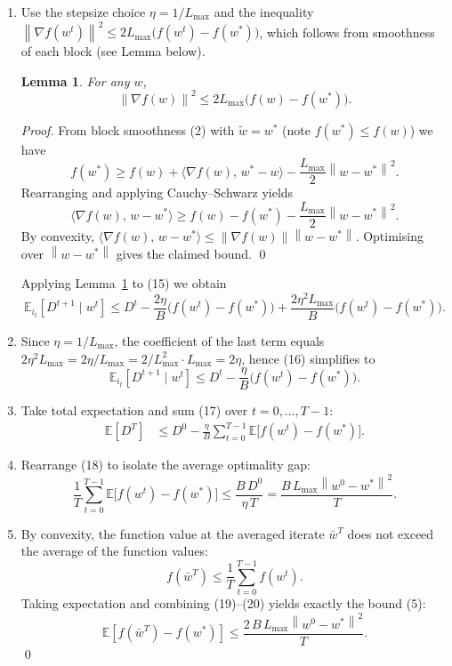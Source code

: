 \documentclass[11pt]{article}
\newtheorem{lemma}{Lemma}
\newcommand{\E}{\mathbb{E}}
\newcommand{\norm}[1]{\left\|#1\right\|}
\begin{document}
\begin{enumerate}
\item[Step 6.] Use the stepsize choice $\eta=1/L_{\max}$ and the inequality
$\norm{\nabla f(w^{t})}^{2}\le 2L_{\max}\bigl(f(w^{t})-f(w^{*})\bigr)$,
which follows from smoothness of each block (see Lemma below).  
\begin{lemma}\label{lem:smooth-grad}
For any $w$,
\[
\norm{\nabla f(w)}^{2}\le 2L_{\max}\bigl(f(w)-f(w^{*})\bigr).
\]
\end{lemma}
\begin{proof}
From block smoothness (2) with $\tilde w = w^{*}$ (note $f(w^{*})\le f(w)$) we have
\[
f(w^{*})\ge f(w)+\langle \nabla f(w),\,w^{*}-w\rangle
-\frac{L_{\max}}{2}\norm{w-w^{*}}^{2}.
\]
Rearranging and applying Cauchy–Schwarz yields
\[
\langle \nabla f(w),\,w-w^{*}\rangle \ge f(w)-f(w^{*})-\frac{L_{\max}}{2}\norm{w-w^{*}}^{2}.
\]
By convexity, $\langle \nabla f(w),\,w-w^{*}\rangle\le \norm{\nabla f(w)}\norm{w-w^{*}}$.
Optimising over $\norm{w-w^{*}}$ gives the claimed bound. \hfill\qed
\end{proof}
Applying Lemma~\ref{lem:smooth-grad} to (15) we obtain
\[
\E_{i_{t}}[D^{t+1}\mid w^{t}]
\le D^{t}
-\frac{2\eta}{B}\bigl(f(w^{t})-f(w^{*})\bigr)
+\frac{2\eta^{2}L_{\max}}{B}\bigl(f(w^{t})-f(w^{*})\bigr).
\tag{16}
\]

\item[Step 7.] Since $\eta=1/L_{\max}$, the coefficient of the last term equals
$2\eta^{2}L_{\max}=2\eta/L_{\max}=2/L_{\max}^{2}\cdot L_{\max}=2\eta$,
hence (16) simplifies to
\[
\E_{i_{t}}[D^{t+1}\mid w^{t}]
\le D^{t}
-\frac{\eta}{B}\bigl(f(w^{t})-f(w^{*})\bigr).
\tag{17}
\]

\item[Step 8.] Take total expectation and sum (17) over $t=0,\dots ,T-1$:
\[
\begin{aligned}
\E[D^{T}]
&\le D^{0}
-\frac{\eta}{B}\sum_{t=0}^{T-1}\E\bigl[f(w^{t})-f(w^{*})\bigr].
\end{aligned}
\tag{18}
\]

\item[Step 9.] Rearrange (18) to isolate the average optimality gap:
\[
\frac{1}{T}\sum_{t=0}^{T-1}\E\bigl[f(w^{t})-f(w^{*})\bigr]
\le \frac{B\,D^{0}}{\eta\,T}
= \frac{B\,L_{\max}\norm{w^{0}-w^{*}}^{2}}{T}.
\tag{19}
\]

\item[Step 10.] By convexity, the function value at the averaged iterate
$\bar w^{T}$ does not exceed the average of the function values:
\[
f(\bar w^{T})\le \frac{1}{T}\sum_{t=0}^{T-1}f(w^{t}).
\tag{20}
\]
Taking expectation and combining (19)–(20) yields exactly the bound (5):
\[
\E\!\left[f(\bar w^{T})-f(w^{*})\right]
\le \frac{2\,B\,L_{\max}\norm{w^{0}-w^{*}}^{2}}{T}.
\]
\hfill\qed
\end{enumerate}
\end{document}
